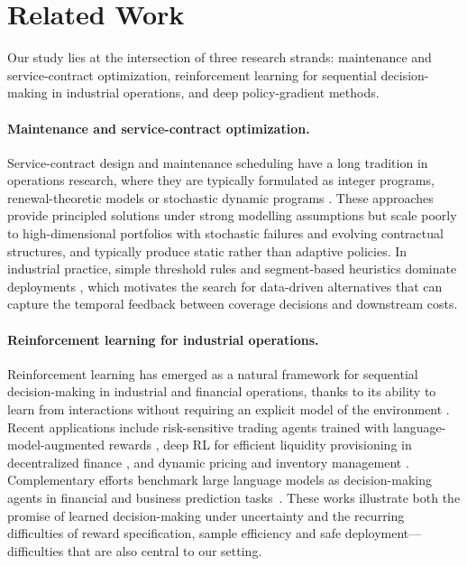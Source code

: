 \section{Related Work}
\label{sec:related_work}

Our study lies at the intersection of three research strands: maintenance and
service-contract optimization, reinforcement learning for sequential
decision-making in industrial operations, and deep policy-gradient methods.


\paragraph{Maintenance and service-contract optimization.}
Service-contract design and maintenance scheduling have a long tradition in
operations research, where they are typically formulated as integer programs,
renewal-theoretic models or stochastic dynamic programs
\cite{jardine2006managing,dekker1996applications}. These approaches provide
principled solutions under strong modelling assumptions but scale poorly to
high-dimensional portfolios with stochastic failures and evolving contractual
structures, and typically produce static rather than adaptive policies. In
industrial practice, simple threshold rules and segment-based heuristics
dominate deployments \cite{gits1992structuring}, which motivates the search
for data-driven alternatives that can capture the temporal feedback between
coverage decisions and downstream costs.


\paragraph{Reinforcement learning for industrial operations.}
Reinforcement learning has emerged as a natural framework for sequential
decision-making in industrial and financial operations, thanks to its
ability to learn from interactions without requiring an explicit model of
the environment \cite{sutton2018reinforcement}. Recent applications include
risk-sensitive trading agents trained with language-model-augmented rewards
\cite{benhenda2025}, deep RL for efficient liquidity provisioning in
decentralized finance \cite{xu2025}, and dynamic pricing and inventory
management \cite{boute2022deep}. Complementary efforts benchmark large
language models as decision-making agents in financial and business
prediction tasks~\cite{benhenda2026lookaheadbench,%
chen2025vcbenchbenchmarkingllmsventure,benhenda2026ycbench,zeng2025,%
chandak2026}. These works illustrate both the promise of learned
decision-making under uncertainty and the recurring difficulties of reward
specification, sample efficiency and safe deployment---difficulties that
are also central to our setting.


